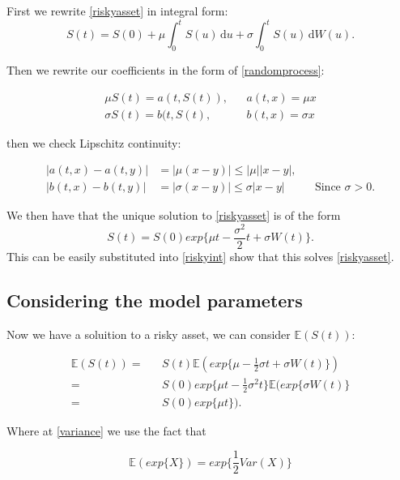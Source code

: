 \documentclass[11pt]{article} %
\begin{document}
First we rewrite \eqref{riskyasset} in integral form:
\begin{equation}\label{riskyint}
    S(t) = S(0) + \mu\int_0^t \! S(u) \, \mathrm{d}u + \sigma\int_0^t \! S(u) \, 
    \mathrm{d}W(u).
\end{equation}

Then we rewrite our coefficients in the form of \eqref{randomprocess}: 

\begin{align}
    \mu S(t) = a(t,S(t)), && a(t,x) = \mu x \\
    \sigma S(t) = b(t,S(t), && b(t,x) = \sigma x
\end{align}

then we check Lipschitz continuity:

\begin{align}
    |a(t,x) - a(t,y)| &= |\mu(x-y)| \leq |\mu||x-y|, \\
    |b(t,x) - b(t,y)| &= |\sigma(x-y)| \leq \sigma|x-y| &&\text{Since $\sigma > 0$.}
\end{align}

We then have that the unique solution to \eqref{riskyasset} is of the form 
\begin{equation}
    S(t) = S(0)exp\{\mu t - \frac{\sigma^2}{2}t + \sigma W(t)\}.
\end{equation}
This can be easily substituted into \eqref{riskyint} show that this solves \eqref{riskyasset}.

\subsection{Considering the model parameters}

Now we have a soluition to a risky asset, we can consider $\mathbb{E}(S(t))$:

\begin{align}
    \mathbb{E}(S(t))  = &&S(t)\mathbb{E}(exp\{\mu - \frac{1}{2}\sigma t + \sigma W(t)\})\\
     \label{variance}= 
     && S(0)exp\{\mu t - \frac{1}{2}\sigma^2 t\}\mathbb{E}(exp\{\sigma W(t)\} \\
    \label{result} = && S(0)exp\{\mu t\}).
\end{align}

Where at \eqref{variance} we use the fact that 

\begin{equation*}
    \mathbb{E}(exp\{X\}) = exp\{\frac{1}{2}Var(X)\}
\end{equation*}
\end{document}
